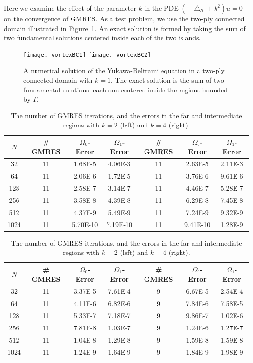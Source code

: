 \documentclass[final]{siamltex}
\newcommand{\lap}{\bigtriangleup}
\renewcommand{\S} {\mathcal{S}}
\begin{document}
Here we examine the effect of the parameter $k$ in the PDE
$(-\lap_{\S} + k^{2})u=0$ on the convergence of GMRES.  As a test
problem, we use the two-ply connected domain illustrated in
Figure~\ref{f:twoply}.  An exact solution is formed by taking the sum
of two fundamental solutions centered inside each of the two islands.

\begin{figure}[htps]
  \texttt{[image: vortexBC1]}
  \texttt{[image: vortexBC2]}
\caption{\label{f:twoply} A numerical solution of the Yukawa-Beltrami
equation in a two-ply connected domain with $k=1$.  The exact solution
is the sum of two fundamental solutions, each one centered inside the
regions bounded by $\Gamma$.}
\end{figure}


\begin{table}[htps]
\centering

\begin{tabular}{c|ccc|ccc}
$N$ & \# GMRES & $\Omega_{0}$-Error & $\Omega_{1}$-Error 
    & \# GMRES & $\Omega_{0}$-Error & $\Omega_{1}$-Error \\
\hline
32   & 11 & 1.68E-5  & 4.06E-3  
     & 11 & 2.63E-5  & 2.11E-3 \\
64   & 11 & 2.06E-6  & 1.72E-5  
     & 11 & 3.76E-6  & 9.61E-6 \\
128  & 11 & 2.58E-7  & 3.14E-7 
     & 11 & 4.46E-7  & 5.28E-7 \\
256  & 11 & 3.58E-8  & 4.39E-8  
     & 11 & 6.29E-8  & 7.45E-8 \\
512  & 11 & 4.37E-9  & 5.49E-9  
     & 11 & 7.24E-9  & 9.32E-9 \\
1024 & 11 & 5.70E-10 & 7.19E-10 
     & 11 & 9.41E-10 & 1.28E-9 \\
\end{tabular}
\caption{\label{t:example1a} The number of GMRES iterations, and the
errors in the far and intermediate regions with $k = 0.51$ (left) and
$k=1$ (right).}

\begin{tabular}{c|ccc|ccc}
$N$ & \# GMRES & $\Omega_{0}$-Error & $\Omega_{1}$-Error 
    & \# GMRES & $\Omega_{0}$-Error & $\Omega_{1}$-Error \\
\hline
32   & 11 & 3.37E-5 & 7.61E-4  
     & 9  & 6.67E-5 & 2.54E-4 \\
64   & 11 & 4.11E-6 & 6.82E-6  
     & 9  & 7.84E-6 & 7.58E-5 \\
128  & 11 & 5.33E-7 & 7.18E-7 
     & 9  & 9.86E-7 & 1.02E-6 \\
256  & 11 & 7.81E-8 & 1.03E-7  
     & 9  & 1.24E-6 & 1.27E-7 \\
512  & 11 & 1.04E-8 & 1.29E-8  
     & 9  & 1.59E-8 & 1.59E-8 \\
1024 & 11 & 1.24E-9 & 1.64E-9 
     & 9  & 1.84E-9 & 1.98E-9 \\
\end{tabular}
\caption{\label{t:example1b} The number of GMRES iterations, and the
errors in the far and intermediate regions with $k = 2$ (left) and
$k=4$ (right).}


\end{table}
\end{document}

